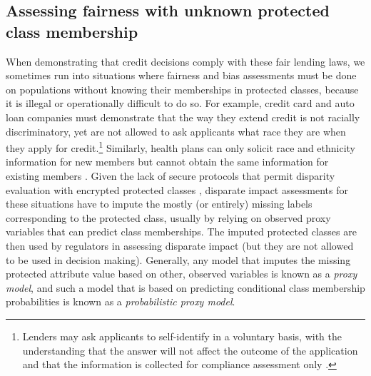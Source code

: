 \subsection{Assessing fairness with unknown protected class membership}

When demonstrating that credit decisions comply with these fair lending laws,
we sometimes run into situations where fairness and bias assessments must be done on populations without knowing their memberships in protected classes, because it is illegal or operationally difficult to do so.
For example, credit card and auto loan companies must demonstrate that the way they extend credit is not racially discriminatory, yet are not allowed to ask applicants what race they are when they apply for credit.\footnote{Lenders may ask applicants to self-identify in a voluntary basis, with the understanding that the answer will not affect the outcome of the application and that the information is collected for compliance assessment only \cite[12 CFR \S 1002.5(b)]{regulationb}.}
Similarly, health plans can only solicit race and ethnicity information for new members but cannot obtain the same information for existing members \cite{elliott2008new}.
Given the lack of secure protocols that permit disparity evaluation with encrypted protected classes \cite{kilbertus2018blind}, disparate impact assessments for these situations have to impute the mostly (or entirely) missing labels corresponding to the protected class, usually by relying on observed proxy variables that can predict class memberships.
 The imputed protected classes are then used by regulators in assessing disparate impact (but they are not allowed to be used in decision making).
 Generally, any model that imputes the missing protected attribute value based on other, observed variables is known as a \emph{proxy model}, and such a model that is based on predicting conditional class membership probabilities is known as a \emph{probabilistic proxy model}.


